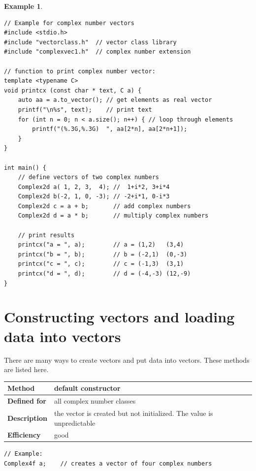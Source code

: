 \documentclass[11pt,a4paper,oneside,openright]{report}
\newtheorem{example}{Example}[chapter]  %
\newcommand{\vspacesmall}{\vspace{3mm}}
\newcommand{\vspacebig}{\vspace{6mm}}
\begin{document}
\begin{example}
\label{exampleRandomGeneration}
\end{example} %
\begin{lstlisting}[frame=single]
// Example for complex number vectors
#include <stdio.h>
#include "vectorclass.h"  // vector class library
#include "complexvec1.h"  // complex number extension

// function to print complex number vector:
template <typename C>
void printcx (const char * text, C a) {
    auto aa = a.to_vector(); // get elements as real vector
    printf("\n%s", text);    // print text
    for (int n = 0; n < a.size(); n++) { // loop through elements
        printf("(%.3G,%.3G)  ", aa[2*n], aa[2*n+1]);
    }
}

int main() {
    // define vectors of two complex numbers
    Complex2d a( 1, 2, 3,  4); //  1+i*2, 3+i*4
    Complex2d b(-2, 1, 0, -3); // -2+i*1, 0-i*3
    Complex2d c = a + b;       // add complex numbers
    Complex2d d = a * b;       // multiply complex numbers

    // print results
    printcx("a = ", a);        // a = (1,2)   (3,4)
    printcx("b = ", b);        // b = (-2,1)  (0,-3)
    printcx("c = ", c);        // c = (-1,3)  (3,1)
    printcx("d = ", d);        // d = (-4,-3) (12,-9)
}
\end{lstlisting}
\vspacesmall


\chapter{Constructing vectors and loading data into vectors} \label{ConstructingVectors}

There are many ways to create vectors and put data into vectors. These methods are listed here.
\vspacebig

\begin{tabular}{|p{25mm}|p{100mm}|}
\hline
\bfseries Method & default constructor \\ \hline
\bfseries Defined for & all complex number classes \\ \hline
\bfseries Description & the vector is created but not initialized.\newline
The value is unpredictable \\ \hline
\bfseries Efficiency & good \\ \hline
\end{tabular}
\vspacesmall

\begin{lstlisting}[frame=none]
// Example:
Complex4f a;    // creates a vector of four complex numbers
\end{lstlisting}
\vspacebig
\end{document}
